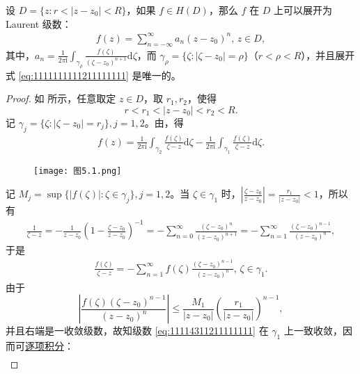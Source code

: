 \documentclass[../../main.tex]{subfiles}
\begin{document}
\begin{theorem}\label{theorem:定理5.1.2}
设 \( D = \{ z: r < |z - z_0| < R \} \)，如果 \( f \in H(D) \)，那么 \( f \) 在 \( D \) 上可以展开为 Laurent 级数：
\begin{align}
f(z) = \sum_{n = -\infty}^{\infty} a_n (z - z_0)^n, \, z \in D, \label{eq:1111111111211111111}
\end{align}
其中，\( a_n = \frac{1}{2\pi \mathrm{i}} \int_{\gamma_{\rho}} \frac{f(\zeta)}{(\zeta - z_0)^{n + 1}} \mathrm{d}\zeta \)，而 \( \gamma_{\rho} = \{ \zeta: |\zeta - z_0| = \rho \} \)（\( r < \rho < R \)），并且展开式 \eqref{eq:1111111111211111111} 是唯一的。
\end{theorem}
\begin{proof}
如 所示，任意取定 \( z \in D \)，取 \( r_1, r_2 \)，使得
\[
r < r_1 < |z - z_0| < r_2 < R.
\]
记 \( \gamma_j = \{ \zeta: |\zeta - z_0| = r_j \}, j = 1, 2 \)。由，得
\begin{align}
f(z) = \frac{1}{2\pi \mathrm{i}} \int_{\gamma_2} \frac{f(\zeta)}{\zeta - z} \mathrm{d}\zeta - \frac{1}{2\pi \mathrm{i}} \int_{\gamma_1} \frac{f(\zeta)}{\zeta - z} \mathrm{d}\zeta. \label{eq:1111111311211111111}
\end{align}
\begin{figure}[H]
\centering
\texttt{[image: 图5.1.png]}
\caption{}
\label{figure:图5.1}
\end{figure}
记 \( M_j = \sup \{ |f(\zeta)|: \zeta \in \gamma_j \}, j = 1, 2 \)。当 \( \zeta \in \gamma_1 \) 时，\( \left| \frac{\zeta - z_0}{z - z_0} \right| = \frac{r_1}{|z - z_0|} < 1 \)，所以有
\begin{align*}
\frac{1}{\zeta - z} = -\frac{1}{z - z_0} \left( 1 - \frac{\zeta - z_0}{z - z_0} \right)^{-1} = -\sum_{n = 0}^{\infty} \frac{(\zeta - z_0)^n}{(z - z_0)^{n + 1}} = -\sum_{n = 1}^{\infty} \frac{(\zeta - z_0)^{n - 1}}{(z - z_0)^n},
\end{align*}
于是
\begin{align}
\frac{f(\zeta)}{\zeta - z} = -\sum_{n = 1}^{\infty} f(\zeta) \frac{(\zeta - z_0)^{n - 1}}{(z - z_0)^n}, \, \zeta \in \gamma_1. \label{eq:11114311211111111}
\end{align}
由于
\[
\left| \frac{f(\zeta)(\zeta - z_0)^{n - 1}}{(z - z_0)^n} \right| \leq \frac{M_1}{|z - z_0|} \left( \frac{r_1}{|z - z_0|} \right)^{n - 1},
\]
并且右端是一收敛级数，故知级数 \eqref{eq:11114311211111111} 在 \( \gamma_1 \) 上一致收敛，因而可\hyperref[theorem:定理4.1.5]{逐项积分}：
\begin{align}

\end{align}
\end{proof}
\end{document}
